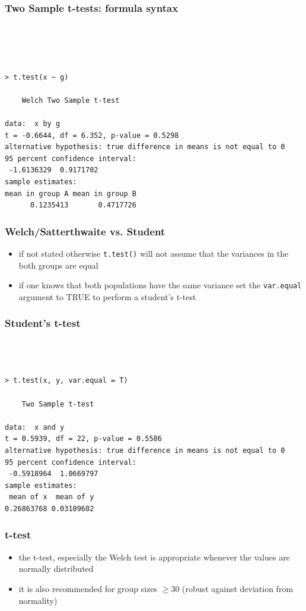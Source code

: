 \documentclass[xcolor={table}]{beamer}
\begin{document}
\begin{frame}[fragile]\frametitle{Two Sample t-tests: formula syntax}\footnotesize
\begin{verbatim}




> t.test(x ~ g)

	Welch Two Sample t-test

data:  x by g
t = -0.6644, df = 6.352, p-value = 0.5298
alternative hypothesis: true difference in means is not equal to 0
95 percent confidence interval:
 -1.6136329  0.9171702
sample estimates:
mean in group A mean in group B 
      0.1235413       0.4717726 
\end{verbatim}
\end{frame}


\begin{frame}[fragile]\frametitle{Welch/Satterthwaite vs. Student}
  \begin{itemize}
  \item if not stated otherwise \texttt{t.test()} will not assume that the variances in the both groups are equal
  \item if one knows that both populations have the same variance set the \texttt{var.equal} argument to TRUE to perform a student's t-test
  \end{itemize}
\end{frame}

\begin{frame}[fragile]\frametitle{Student's t-test}\footnotesize
\begin{verbatim}



> t.test(x, y, var.equal = T)

	Two Sample t-test

data:  x and y
t = 0.5939, df = 22, p-value = 0.5586
alternative hypothesis: true difference in means is not equal to 0
95 percent confidence interval:
 -0.5918964  1.0669797
sample estimates:
 mean of x  mean of y 
0.26863768 0.03109602   
\end{verbatim}
\end{frame}

\begin{frame}[fragile]\frametitle{t-test}
  \begin{itemize}
  \item the t-test, especially the Welch test is appropriate whenever the values are normally distributed
  \item it is also recommended for group sizes $\geq 30$ (robust against deviation from normality)
  \end{itemize}
\end{frame}
\end{document}
